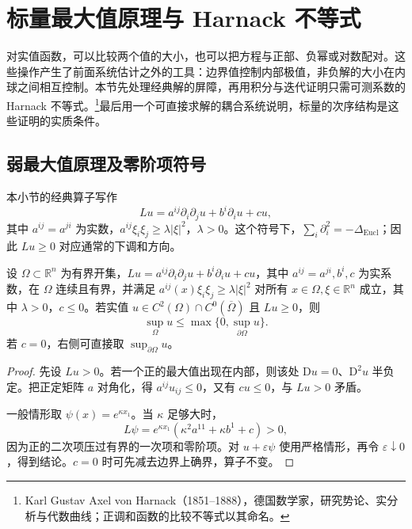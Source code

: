 
% 
% 
% 

\section{标量最大值原理与 Harnack 不等式}
\label{g3:sec:1207}

对实值函数，可以比较两个值的大小，也可以把方程与正部、负幂或对数配对。这些操作产生了前面系统估计之外的工具：边界值控制内部极值，非负解的大小在内球之间相互控制。本节先处理经典解的屏障，再用积分与迭代证明只需可测系数的 Harnack 不等式。\footnote{Karl Gustav Axel von Harnack（1851--1888），德国数学家，研究势论、实分析与代数曲线；正调和函数的比较不等式以其命名。}最后用一个可直接求解的耦合系统说明，标量的次序结构是这些证明的实质条件。

\subsection{弱最大值原理及零阶项符号}
\label{g3:subsec:1207:01}
本小节的经典算子写作
\begin{equation}\label{g3:eq:scalar-maximum-operator}
	Lu=a^{ij}\partial_i\partial_ju+b^i\partial_i u+cu,
\end{equation}
其中 \(a^{ij}=a^{ji}\) 为实数，\(a^{ij}\xi_i\xi_j\ge\lambda|\xi|^2\)，\(\lambda>0\)。这个符号下，\(\sum_i\partial_i^2=-\Delta_{\mathrm{Eucl}}\)；因此 \(Lu\ge0\) 对应通常的下调和方向。

\begin{theorem}[弱最大值原理]\label{g3:thm:weak-maximum-classical}
	设 \(\Omega\subset\mathbb R^n\) 为有界开集，\(Lu=a^{ij}\partial_i\partial_ju+b^i\partial_i u+cu\)，其中 \(a^{ij}=a^{ji},b^i,c\) 为实系数，在 \(\Omega\) 连续且有界，并满足 \(a^{ij}(x)\xi_i\xi_j\ge\lambda|\xi|^2\) 对所有 \(x\in\Omega,\xi\in\mathbb R^n\) 成立，其中 \(\lambda>0\)，\(c\le0\)。若实值 \(u\in C^2(\Omega)\cap C^0(\overline\Omega)\) 且 \(Lu\ge0\)，则
	\[
		\sup_\Omega u\le\max\{0,\sup_{\partial\Omega}u\}.
	\]
	若 \(c=0\)，右侧可直接取 \(\sup_{\partial\Omega}u\)。
\end{theorem}
\begin{proof}
	先设 \(Lu>0\)。若一个正的最大值出现在内部，则该处 \(\mathrm Du=0\)、\(\mathrm D^2u\) 半负定。把正定矩阵 \(a\) 对角化，得 \(a^{ij}u_{ij}\le0\)，又有 \(cu\le0\)，与 \(Lu>0\) 矛盾。

	一般情形取 \(\psi(x)=e^{\kappa x_1}\)。当 \(\kappa\) 足够大时，
	\[
		L\psi=e^{\kappa x_1}(\kappa^2a^{11}+\kappa b^1+c)>0,
	\]
	因为正的二次项压过有界的一次项和零阶项。对 \(u+\varepsilon\psi\) 使用严格情形，再令 \(\varepsilon\downarrow0\)，得到结论。\(c=0\) 时可先减去边界上确界，算子不变。
\end{proof}

